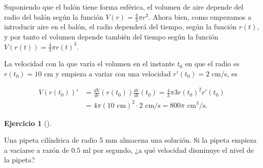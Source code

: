 \documentclass[
  spanish,
  a4paper,
]{scrreport}
\theoremstyle{definition}
\newtheorem{exercise}{Ejercicio}[chapter]
\theoremstyle{remark}
\begin{document}
\begin{tcolorbox}[enhanced jigsaw, arc=.35mm, bottomrule=.15mm, bottomtitle=1mm, breakable, colback=white, colbacktitle=quarto-callout-tip-color!10!white, colframe=quarto-callout-tip-color-frame, coltitle=black, left=2mm, leftrule=.75mm, opacityback=0, opacitybacktitle=0.6, rightrule=.15mm, title=\textcolor{quarto-callout-tip-color}{\faLightbulb}\hspace{0.5em}{Solución}, titlerule=0mm, toprule=.15mm, toptitle=1mm]

Suponiendo que el balón tiene forma esférica, el volumen de aire depende
del radio del balón según la función \(V(r)=\frac{4}{3}\pi r^3\). Ahora
bien, como empezamos a introducir aire en el balón, el radio dependerá
del tiempo, según la función \(r(t)\), y por tanto el volumen depende
también del tiempo según la función \(V(r(t)) = \frac{4}{3}\pi r(t)^3\).

La velocidad con la que varía el volumen en el instante \(t_0\) en que
el radio es \(r(t_0)=10\) cm y empieza a variar con una velocidad
\(r'(t_0)=2\) cm/s, es

\begin{align*}
V(r(t_0))' &= \frac{dV}{dr}(r(t_0))\frac{dr}{dt}(t_0) = \frac{4}{3}\pi 3 r(t_0)^2 r'(t_0)\\ 
& = 4\pi (10\mbox{ cm})^2\cdot 2\mbox{ cm/s} = 800\pi \mbox{ cm$^3$/s}.
\end{align*}

\end{tcolorbox}

\begin{exercise}[]\protect\hypertarget{exr-regla-cadena-3}{}\label{exr-regla-cadena-3}

Una pipeta cilíndrica de radio 5 mm almacena una solución. Si la pipeta
empieza a vaciarse a razón de \(0.5\) ml por segundo, ¿a qué velocidad
disminuye el nivel de la pipeta?

\end{exercise}
\end{document}
